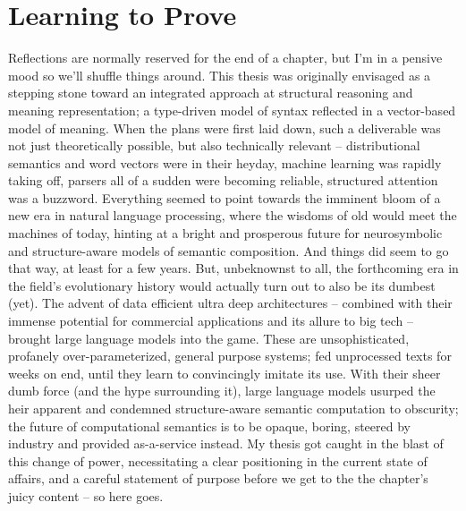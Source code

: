 \chapter{Learning to Prove}
\label{chapter:chapter_4}




Reflections are normally reserved for the end of a chapter, but I'm in a pensive mood so we'll shuffle things around.
This thesis was originally envisaged as a stepping stone toward an integrated approach at structural reasoning and meaning representation; a type-driven model of syntax reflected in a vector-based model of meaning.
When the plans were first laid down, such a deliverable was not just theoretically possible, but also technically relevant -- distributional semantics and word vectors were in their heyday, machine learning was rapidly taking off, parsers all of a sudden were becoming reliable, structured attention was a buzzword.
Everything seemed to point towards the imminent bloom of a new era in natural language processing, where the wisdoms of old would meet the machines of today, hinting at a bright and prosperous future for neurosymbolic and structure-aware models of semantic composition.
And things did seem to go that way, at least for a few years.
But, unbeknownst to all, the forthcoming era in the field's evolutionary history would actually turn out to also be its dumbest (yet).
The advent of data efficient ultra deep architectures -- combined with their immense potential for commercial applications and its allure to big tech -- brought large language models into the game.
These are unsophisticated, profanely over-parameterized, general purpose systems; fed unprocessed texts for weeks on end, until they learn to convincingly imitate its use.
With their sheer dumb force (and the hype surrounding it), large language models usurped the heir apparent and condemned structure-aware semantic computation to obscurity; the future of computational semantics is to be opaque, boring, steered by industry and provided as-a-service instead.
My thesis got caught in the blast of this change of power, necessitating a clear positioning in the current state of affairs, and a careful statement of purpose before we get to the the chapter's juicy content -- so here goes.

